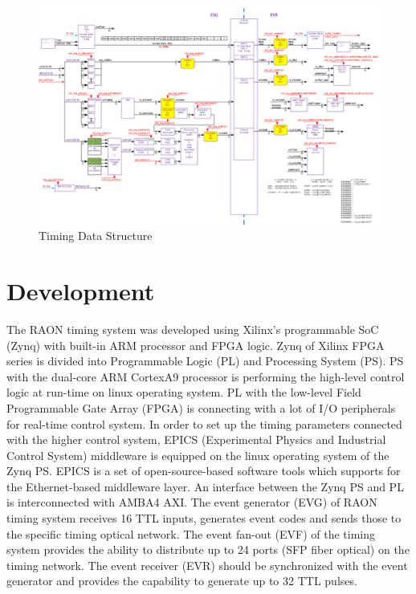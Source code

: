 \documentclass[journal,reqno]{IEEEtran}
\begin{document}
\begin{figure}[!htb]
	\centering
	\includegraphics*[width=1\textwidth, height=0.5\textwidth]{img1-1.png}
	\caption{Timing Data Structure}
	\label{timing_data_structure}
\end{figure}

\section{Development}
The RAON timing system was developed using Xilinx’s programmable SoC (Zynq) with built-in ARM processor and FPGA logic. Zynq of Xilinx FPGA series is divided into Programmable Logic (PL) and Processing System (PS). PS with the dual-core ARM CortexA9 processor is performing the high-level control logic at run-time on linux operating system. PL with the low-level Field Programmable Gate Array (FPGA) is connecting with a lot of I/O peripherals for real-time control system. In order to set up the timing parameters connected with the higher control system, EPICS (Experimental Physics and Industrial Control System) middleware is equipped on the linux operating system of the Zynq PS. EPICS is a set of open-source-based software tools which supports for the Ethernet-based middleware layer. An interface between the Zynq PS and PL is interconnected with AMBA4 AXI. The event generator (EVG) of RAON timing system receives 16 TTL inputs, generates event codes and sends those to the specific timing optical network. The event fan-out (EVF) of the timing system provides the ability to distribute up to 24 ports (SFP fiber optical) on the timing network. The event receiver (EVR) should be synchronized with the event generator and provides the capability to generate up to 32 TTL pulses. 
\end{document}
